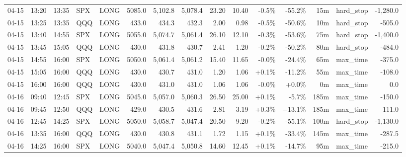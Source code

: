 \documentclass[11pt,a4paper,twoside]{article}
\begin{document}
\begin{landscape}
\begin{center}
\begin{longtable}{>{\color{txtmain}}l l l l l r r r r r r r r >{\color{txtmain}}l r}
04-15 & 13:20 & 13:35 & SPX & LONG & 5085.0 & 5,102.8 & 5,078.4 & 23.20 & 10.40 & \textcolor{lossred}{-0.5\%} & \textcolor{lossred}{-55.2\%} & 15m & hard\_stop & \textcolor{lossred}{-1,280.0} \\
04-15 & 13:25 & 13:35 & QQQ & LONG & 433.0 & 434.3 & 432.3 & 2.00 & 0.98 & \textcolor{lossred}{-0.5\%} & \textcolor{lossred}{-50.6\%} & 10m & hard\_stop & \textcolor{lossred}{-505.0} \\
04-15 & 13:40 & 14:55 & SPX & LONG & 5055.0 & 5,074.7 & 5,061.4 & 26.10 & 12.10 & \textcolor{lossred}{-0.3\%} & \textcolor{lossred}{-53.6\%} & 75m & hard\_stop & \textcolor{lossred}{-1,400.0} \\
04-15 & 13:45 & 15:05 & QQQ & LONG & 430.0 & 431.8 & 430.7 & 2.41 & 1.20 & \textcolor{lossred}{-0.2\%} & \textcolor{lossred}{-50.2\%} & 80m & hard\_stop & \textcolor{lossred}{-484.0} \\
04-15 & 14:55 & 16:00 & SPX & LONG & 5050.0 & 5,061.4 & 5,061.2 & 15.40 & 11.65 & \textcolor{lossred}{-0.0\%} & \textcolor{lossred}{-24.4\%} & 65m & max\_time & \textcolor{lossred}{-375.0} \\
04-15 & 15:05 & 16:00 & QQQ & LONG & 430.0 & 430.7 & 431.0 & 1.20 & 1.06 & \textcolor{wingreen}{+0.1\%} & \textcolor{lossred}{-11.2\%} & 55m & max\_time & \textcolor{lossred}{-108.0} \\
04-15 & 16:00 & 16:00 & QQQ & LONG & 430.0 & 431.0 & 431.0 & 1.06 & 1.06 & \textcolor{lossred}{-0.0\%} & \textcolor{wingreen}{+0.0\%} & 0m & max\_time & \textcolor{wingreen}{0.0} \\
04-16 & 09:40 & 12:45 & SPX & LONG & 5045.0 & 5,057.0 & 5,060.3 & 26.50 & 25.00 & \textcolor{wingreen}{+0.1\%} & \textcolor{lossred}{-5.7\%} & 185m & max\_time & \textcolor{lossred}{-150.0} \\
04-16 & 09:45 & 12:50 & QQQ & LONG & 429.0 & 430.5 & 431.6 & 2.81 & 3.19 & \textcolor{wingreen}{+0.3\%} & \textcolor{wingreen}{+13.1\%} & 185m & max\_time & \textcolor{wingreen}{111.0} \\
04-16 & 12:45 & 14:25 & SPX & LONG & 5050.0 & 5,058.7 & 5,047.4 & 20.50 & 9.20 & \textcolor{lossred}{-0.2\%} & \textcolor{lossred}{-55.1\%} & 100m & hard\_stop & \textcolor{lossred}{-1,130.0} \\
04-16 & 13:35 & 16:00 & QQQ & LONG & 430.0 & 430.8 & 431.1 & 1.72 & 1.15 & \textcolor{wingreen}{+0.1\%} & \textcolor{lossred}{-33.4\%} & 145m & max\_time & \textcolor{lossred}{-287.5} \\
04-16 & 14:25 & 16:00 & SPX & LONG & 5040.0 & 5,047.4 & 5,050.8 & 14.60 & 12.45 & \textcolor{wingreen}{+0.1\%} & \textcolor{lossred}{-14.7\%} & 95m & max\_time & \textcolor{lossred}{-215.0} \\

\end{longtable}
\end{center}
\end{landscape}
\end{document}
